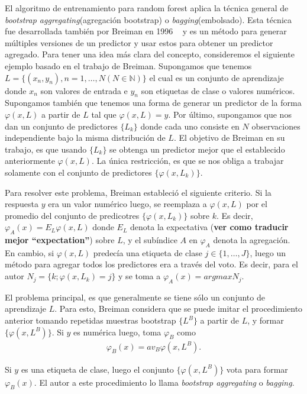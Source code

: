 	El algoritmo de entrenamiento para random forest aplica la técnica general de \textit{bootstrap aggregating}(agregación bootstrap) o \textit{bagging}(embolsado). Esta técnica fue desarrollada también por Breiman en 1996 ~\cite{LBreiman96} y es un método para generar múltiples versiones de un predictor y usar estos para obtener un predictor agregado. Para tener una idea más clara del concepto, consideremos el siguiente ejemplo basado en el trabajo de Breiman. Supongamos que tenemos $L = \{ (x_n,y_n), n = 1,\dots, N (N \in \mathbb{N}) \}$ el cual es un conjunto de aprendizaje donde $x_n$ son valores de entrada e $y_n$ son etiquetas de clase o valores numéricos. Supongamos también que tenemos una forma de generar un predictor de la forma $\varphi(x,L)$ a partir de $L$ tal que $ \varphi(x,L) = y $. Por último, supongamos que nos dan un conjunto de predictores $\{ L_k \}$ donde cada uno consiste en $N$ observaciones independiente bajo la misma distribución de $L$. El objetivo de Breiman en su trabajo, es que usando $\{ L_k \}$ se obtenga un predictor mejor que el establecido anteriormente $\varphi(x,L)$. La única restricción, es que se nos obliga a trabajar solamente con el conjunto de predictores $\{ \varphi(x, L_k)\} $. 
	
	Para resolver este problema, Breiman estableció el siguiente criterio. Si la respuesta $y$ era un valor numérico luego, se reemplaza a $\varphi(x,L)$ por el promedio del conjunto de predicotres $ \{ \varphi(x, L_k)\} $ sobre $k$. Es decir, $\varphi_A(x) = E_L\varphi(x,L)$ donde $E_L$ denota la expectativa (\textbf{ver como traducir mejor ``expectation''}) sobre $L$, y el subíndice $A$ en $\varphi_A$ denota la agregación. En cambio, si $ \varphi(x,L)$ predecía una etiqueta de clase $j \in \{ 1,\dots, J \} $, luego un método para agregar todos los predictores era a través del voto. Es decir, para el autor $N_j = \{ k;\varphi(x, L_k) = j \}$ y se toma a $\varphi_A(x) = argmax N_j$.
	
	El problema principal, es que generalmente se tiene sólo un conjunto de aprendizaje $L$. Para esto, Breiman considera que se puede imitar el procedimiento anterior tomando repetidas muestras bootstrap $\{ L^{B} \}$ a partir de $L$, y formar $\{ \varphi(x, L^{B}) \}$. Si $y$ es numérica luego, toma $\varphi_B$ como
	\begin{align*}
		\varphi_B(x) = av_B\varphi(x,L^{B}).
	\end{align*}
	
	Si $y$ es una etiqueta de clase, luego el conjunto  $\{ \varphi(x, L^{B}) \}$ vota para formar $\varphi_B(x)$. El autor a este procedimiento lo llama  \textit{bootstrap aggregating} o \textit{bagging}.
	
